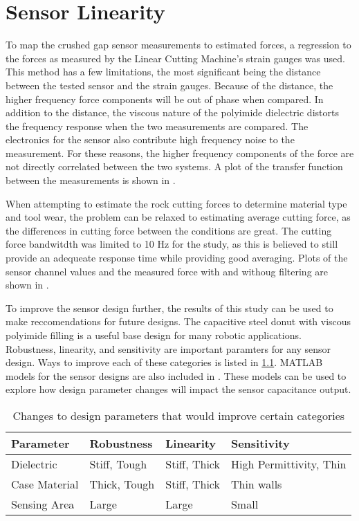 \chapter{Sensor Linearity
\label{chap:10}}

To map the crushed gap sensor measurements to estimated forces, 
a regression to the forces as measured by the 
Linear Cutting Machine's strain gauges was used.
This method has a few limitations, the most significant
being the distance between the tested sensor and the strain gauges.
Because of the distance, the higher frequency force components will
be out of phase when compared. 
In addition to the distance, the viscous nature of the polyimide dielectric distorts the 
frequency response when the two measurements are compared.
The electronics for the sensor also contribute high frequency noise to the measurement.
For these reasons, the higher frequency components of the force are not directly correlated 
between the two systems. 
A plot of the transfer function between the measurements is shown in .

When attempting to estimate the rock cutting forces to determine material type and tool wear, 
the problem can be relaxed to estimating average cutting force, as the differences in 
cutting force between the conditions are great.
The cutting force bandwitdth was limited to 10 Hz for the study, as this is believed to still
provide an adequeate response time while providing good averaging.
Plots of the sensor channel values and the measured force with and withoug filtering are shown in .

To improve the sensor design further, the results of this study can be used 
to make reccomendations for future designs. 
The capacitive steel donut with viscous polyimide filling is a useful base design
for many robotic applications. Robustness, linearity, and sensitivity are important 
paramters for any sensor design. Ways to improve each of these categories is listed in \ref{tab:improve}.
MATLAB models for the sensor designs are also included in . 
These models can be used to explore how design parameter changes will impact the sensor capacitance output.

\begin{table}[]
\centering
\caption{Changes to design parameters that would improve certain categories}
\label{tab:improve}
\begin{tabular}{|l|l|l|l|}
\hline
Parameter     & Robustness   & Linearity    & Sensitivity               \\ \hline
Dielectric    & Stiff, Tough & Stiff, Thick & High Permittivity, Thin   \\ \hline
Case Material & Thick, Tough & Stiff, Thick & Thin walls                \\ \hline
Sensing Area  & Large        & Large        & Small                     \\ \hline
\end{tabular}
\end{table}


